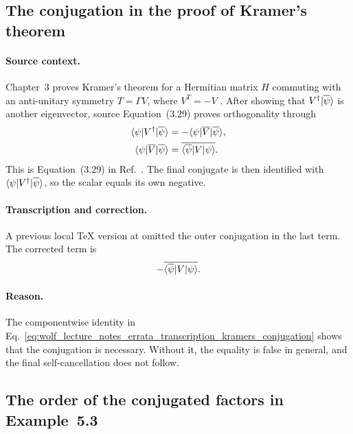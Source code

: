 \documentclass{article}
\begin{document}
\subsection{The conjugation in the proof of Kramer's theorem}

\paragraph{Source context.}
Chapter~3 proves Kramer's theorem for a Hermitian matrix $H$ commuting with an
anti-unitary symmetry $T=\Gamma V$, where $V^T=-V$
\cite{Wolf2012Quantum}. After showing that
$V^\dagger|\overline\psi\rangle$ is another eigenvector, source
Equation~(3.29) proves orthogonality through
\begin{align}
    \langle \psi|V^\dagger|\overline\psi\rangle
        &=-\langle \psi|\overline V|\overline\psi\rangle,
    \label{eq:wolf_lecture_notes_errata_transcription_kramers_first_equality}\\
    \langle \psi|\overline V|\overline\psi\rangle
        &=\overline{\langle \overline\psi|V|\psi\rangle}.
    \label{eq:wolf_lecture_notes_errata_transcription_kramers_conjugation}
\end{align}
This is Equation~(3.29) in Ref.~\cite{Wolf2012Quantum}. The final conjugate is
then identified with
$\langle \psi|V^\dagger|\overline\psi\rangle$, so the scalar equals its own
negative.

\paragraph{Transcription and correction.}
A previous local TeX version at
 omitted the outer conjugation in
the last term. The corrected term is
\begin{align}
    -\overline{\langle \overline\psi|V|\psi\rangle}.
    \label{eq:wolf_lecture_notes_errata_transcription_kramers_correct_term}
\end{align}

\paragraph{Reason.}
The componentwise identity in
Eq.~\ref{eq:wolf_lecture_notes_errata_transcription_kramers_conjugation}
shows that the conjugation is necessary. Without it, the equality is false in
general, and the final self-cancellation does not follow.

\subsection{The order of the conjugated factors in Example~5.3}
\end{document}
